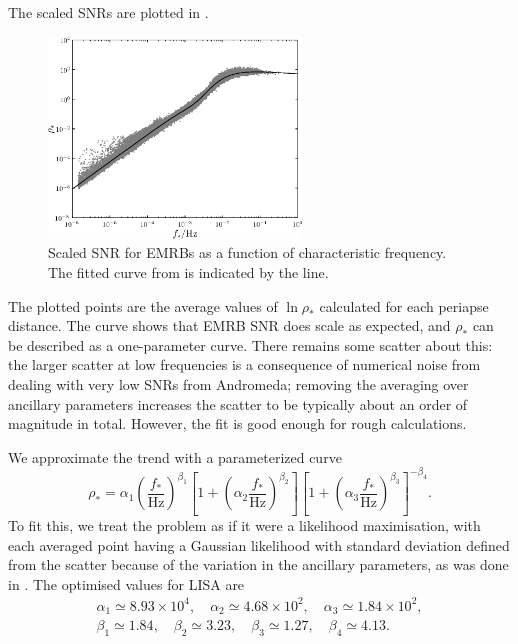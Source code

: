 The scaled SNRs are plotted in . 
\begin{figure}
\centering
 \includegraphics[width=0.6\textwidth]{./images/Fig_SNR_scaled_fit}
 \caption{Scaled SNR for EMRBs as a function of characteristic frequency. The fitted curve from  is indicated by the line.}
 \label{fig:scaled-SNR}
\end{figure}
The plotted points are the average values of $\ln \rho_\ast$ calculated for each periapse distance. The curve shows that EMRB SNR does scale as expected, and $\rho_\ast$ can be described as a one-parameter curve. There remains some scatter about this: the larger scatter at low frequencies is a consequence of numerical noise from dealing with very low SNRs from Andromeda; removing the averaging over ancillary parameters increases the scatter to be typically about an order of magnitude in total. However, the fit is good enough for rough calculations.

We approximate the trend with a parameterized curve
\begin{equation}
\rho_\ast = \alpha_1 \left(\dfrac{f_\ast}{\mathrm{Hz}}\right)^{\beta_1} \left[1 + \left(\alpha_2 \dfrac{f_\ast}{\mathrm{Hz}}\right)^{\beta_2}\right]\left[1 + \left(\alpha_3 \dfrac{f_\ast}{\mathrm{Hz}}\right)^{\beta_3}\right]^{-\beta_4}.
\label{eq:scaled-SNR}
\end{equation}
To fit this, we treat the problem as if it were a likelihood maximisation, with each averaged point having a Gaussian likelihood with standard deviation defined from the scatter because of the variation in the ancillary parameters, as was done in . The optimised values for LISA are
\begin{equation}
\begin{array}{c}
\alpha_1 \simeq 8.93 \times 10^4, \quad \alpha_2 \simeq 4.68 \times 10^2, \quad \alpha_3 \simeq 1.84 \times 10^2,\\
\beta_1 \simeq 1.84, \quad \beta_2 \simeq 3.23, \quad \beta_3 \simeq 1.27, \quad \beta_4 \simeq 4.13.
\end{array}
\end{equation}


